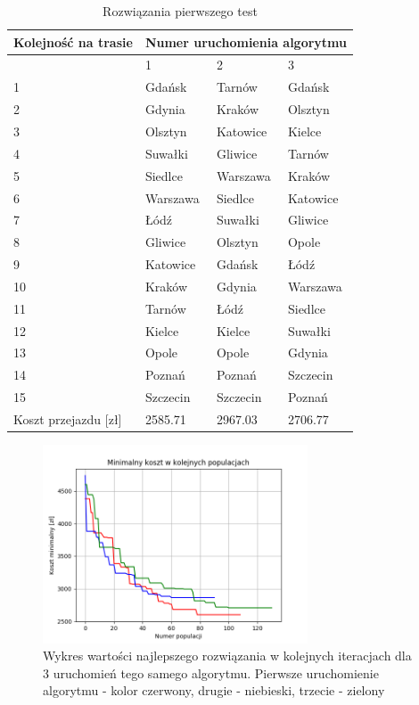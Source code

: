 \documentclass[12pt, oneside, final]{report}
\begin{document}
\begin{table}[ht!]
\caption{Rozwiązania pierwszego test}
\label{tab:results-same-algorithm}
\centering
\begin{tabular}{llll}
\hline 
Kolejność na trasie & \multicolumn{3}{c}{Numer uruchomienia algorytmu}\\
\hline
						& 1 & 2 & 3\\
\hline
1 						& Gdańsk	& Tarnów	& Gdańsk\\
2						& Gdynia	& Kraków	& Olsztyn\\
3						& Olsztyn	& Katowice	& Kielce\\
4						& Suwałki	& Gliwice	& Tarnów\\
5						& Siedlce	& Warszawa	& Kraków\\
6						& Warszawa	& Siedlce	& Katowice\\
7						& Łódź		& Suwałki	& Gliwice\\
8						& Gliwice	& Olsztyn	& Opole\\
9						& Katowice	& Gdańsk	& Łódź\\
10						& Kraków	& Gdynia	& Warszawa\\
11						& Tarnów	& Łódź		& Siedlce\\
12						& Kielce	& Kielce	& Suwałki\\
13						& Opole		& Opole		& Gdynia\\
14						& Poznań	& Poznań	& Szczecin\\
15						& Szczecin	& Szczecin	& Poznań\\
\hline
Koszt przejazdu [zł]	& 2585.71	& 2967.03 	& 2706.77\\
\hline
\end{tabular}
\end{table}



\begin{figure}[ht!]
\centering
\includegraphics[width=0.7\textwidth]{graphics/same-problem-same-algorithm}
\caption{Wykres wartości najlepszego rozwiązania w kolejnych iteracjach dla 3 uruchomień tego samego algorytmu. Pierwsze uruchomienie algorytmu - kolor czerwony, drugie - niebieski, trzecie - zielony}
\label{fig:same-problem-same-algorithm}
\end{figure}
\end{document}

